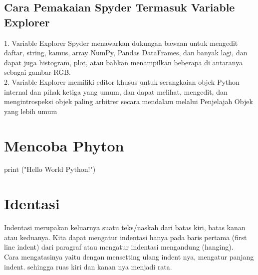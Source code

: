 \documentclass[lipt]{Article}
\begin{document}
\section{Cara Pemakaian Spyder Termasuk Variable Explorer}
1. Variable Explorer Spyder menawarkan dukungan bawaan untuk mengedit daftar, string, kamus, array NumPy, Pandas DataFrames, dan banyak lagi, dan dapat juga histogram, plot, atau bahkan menampilkan beberapa di antaranya sebagai gambar RGB.\\
2. Variable Explorer memiliki editor khusus untuk serangkaian objek Python internal dan pihak ketiga yang umum, dan dapat melihat, mengedit, dan mengintrospeksi objek paling arbitrer secara mendalam melalui Penjelajah Objek yang lebih umum\\

\chapter{Mencoba Phyton}
print ("Hello World Python!")

\chapter{Identasi}
Indentasi merupakan keluarnya suatu teks/naskah dari batas kiri, batas kanan atau keduanya. Kita dapat mengatur indentasi hanya pada baris pertama (first line indent) dari paragraf atau mengatur indentasi mengandung (hanging).\\

Cara mengatasinya yaitu dengan mensetting ulang indent nya, mengatur panjang indent. sehingga ruas kiri dan kanan nya menjadi rata.
\end{document}
